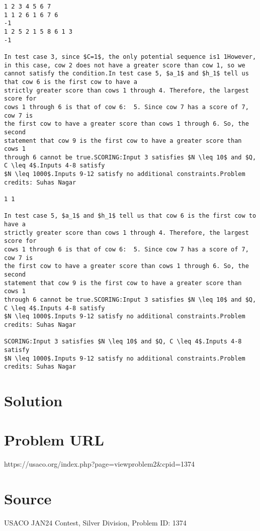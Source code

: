 \documentclass[12pt]{article}
\begin{document}
\begin{verbatim}
1 2 3 4 5 6 7
1 1 2 6 1 6 7 6
-1
1 2 5 2 1 5 8 6 1 3
-1

In test case 3, since $C=1$, the only potential sequence is1 1However, in this case, cow 2 does not have a greater score than cow 1, so we
cannot satisfy the condition.In test case 5, $a_1$ and $h_1$ tell us that cow 6 is the first cow to have a
strictly greater score than cows 1 through 4. Therefore, the largest score for
cows 1 through 6 is that of cow 6:  5. Since cow 7 has a score of 7, cow 7 is
the first cow to have a greater score than cows 1 through 6. So, the second
statement that cow 9 is the first cow to have a greater score than cows 1
through 6 cannot be true.SCORING:Input 3 satisfies $N \leq 10$ and $Q, C \leq 4$.Inputs 4-8 satisfy
$N \leq 1000$.Inputs 9-12 satisfy no additional constraints.Problem credits: Suhas Nagar

1 1

In test case 5, $a_1$ and $h_1$ tell us that cow 6 is the first cow to have a
strictly greater score than cows 1 through 4. Therefore, the largest score for
cows 1 through 6 is that of cow 6:  5. Since cow 7 has a score of 7, cow 7 is
the first cow to have a greater score than cows 1 through 6. So, the second
statement that cow 9 is the first cow to have a greater score than cows 1
through 6 cannot be true.SCORING:Input 3 satisfies $N \leq 10$ and $Q, C \leq 4$.Inputs 4-8 satisfy
$N \leq 1000$.Inputs 9-12 satisfy no additional constraints.Problem credits: Suhas Nagar

SCORING:Input 3 satisfies $N \leq 10$ and $Q, C \leq 4$.Inputs 4-8 satisfy
$N \leq 1000$.Inputs 9-12 satisfy no additional constraints.Problem credits: Suhas Nagar
\end{verbatim}

\section*{Solution}


\section*{Problem URL}
https://usaco.org/index.php?page=viewproblem2&cpid=1374

\section*{Source}
USACO JAN24 Contest, Silver Division, Problem ID: 1374
\end{document}
